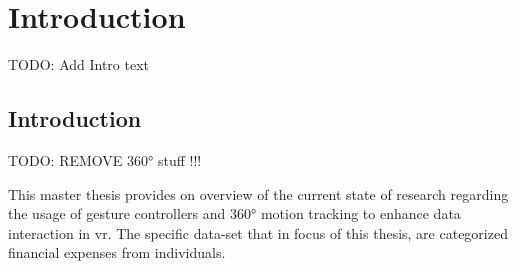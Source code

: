 
\chapter{Introduction} %

\label{ChapterIntroduction} %

TODO: Add Intro text


\section{Introduction}

TODO: REMOVE 360° stuff !!!

This master thesis provides on overview of the current state of research regarding the usage of gesture controllers and 360° motion tracking to enhance data interaction in \gls{vr}. The specific data-set that in focus of this thesis, are categorized financial expenses from individuals.

